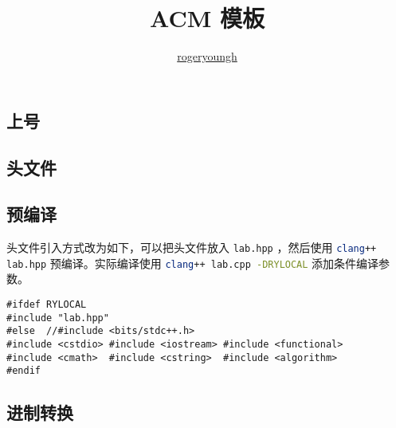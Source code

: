 \documentclass{probook}
\title{ACM 模板}
\author{\href{https://github.com/rogeryoungh}{rogeryoungh}}
\begin{document}
\newcommand\mfrac[2]{\dfrac{#1\smash[b]{\strut}}{#2\smash[t]{\strut}}}
\newcommand\ee{\mathrm{e}}
\newcommand\dd{\mathrm{d}}
\newcommand\uppi{\mathrm{\pi}}

\newcommand{\lcm}{\operatorname{lcm}}
\newcommand{\DFT}{\operatorname{DFT}_{\omega_n}}
\newcommand{\Id}{\operatorname{Id}}

\maketitle

\frontmatter

\columnseprule=2pt
\setlength{\columnsep}{30pt}
\begin{multicols}{2}

\tableofcontents

\mainmatter






\chapter{上号}

\section{头文件}



\section{预编译}

头文件引入方式改为如下，可以把头文件放入 \lstinline[style=cpp]{lab.hpp} ，然后使用 \lstinline[language=bash]{clang++ lab.hpp} 预编译。实际编译使用 \lstinline[language=bash]{clang++ lab.cpp -DRYLOCAL} 添加条件编译参数。

\begin{lstlisting}[style=cpp]
#ifdef RYLOCAL
#include "lab.hpp"
#else  //#include <bits/stdc++.h>
#include <cstdio> #include <iostream> #include <functional>
#include <cmath>  #include <cstring>  #include <algorithm>
#endif
\end{lstlisting}

\section{进制转换}




\end{multicols}
\end{document}

